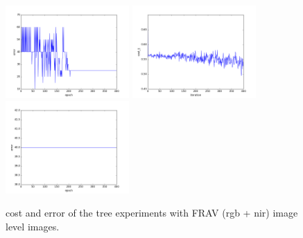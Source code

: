\begin{figure}[htb]
\includegraphics[width=0.42\textwidth]{images/redes/ejecucion1/general_svm_frav_rgb_nir/minidataset_tested_itself/error.png}
\includegraphics[width=0.42\textwidth]{images/redes/ejecucion1/general_svm_frav_rgb_nir/minidataset_tested_iteself_lr_0_001/cost.png}
\includegraphics[width=0.42\textwidth]{images/redes/ejecucion1/general_svm_frav_rgb_nir/minidataset_tested_iteself_lr_0_001/error.png}
\caption{cost and error of the tree experiments with FRAV (rgb + nir) image level images.} \label{fig:frav_imagelevel-ejec1}
\end{figure}


